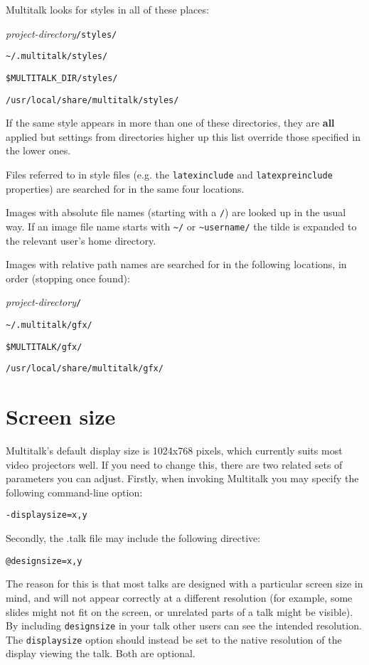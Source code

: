 \documentclass[12pt,a4paper,twoside]{article}
\renewcommand{\_}{\texttt{\symbol{95}}}
\begin{document}
Multitalk looks for styles in all of these places:
\begin{numericlist}
\item \textit{project-directory}\verb^/styles/^
\item \verb^~/.multitalk/styles/^
\item \verb^$MULTITALK_DIR/styles/^
\item \verb^/usr/local/share/multitalk/styles/^
\end{numericlist}
If the same style appears in more than one of these directories, they
are \textbf{all} applied but settings from directories higher up this list
override those specified in the lower ones.

Files referred to in style files (e.g. the \verb=latexinclude= and
\verb=latexpreinclude= properties) are searched for in the same four
locations.

Images with absolute file names (starting with a \verb=/=) are looked up in
the usual way. If an image file name starts with \verb^~/^ or
\verb^~username/^ the tilde is expanded to the relevant user's home
directory.

Images with relative path names are searched for in the
following locations, in order (stopping once found):
\begin{numericlist}
\item \textit{project-directory}\verb^/^
\item \verb^~/.multitalk/gfx/^
\item \verb^$MULTITALK/gfx/^
\item \verb^/usr/local/share/multitalk/gfx/^
\end{numericlist}

\section{Screen size}

Multitalk's default display size is 1024x768 pixels, which currently
suits most video projectors well. If you need to change this, there
are two related sets of parameters you can adjust. Firstly, when invoking
Multitalk you may specify the following command-line option:

\verb^-displaysize=x,y^

Secondly, the .talk file may include the following directive:

\verb^@designsize=x,y^

The reason for this is that most talks are designed with a particular
screen size in mind, and will not appear correctly at a different
resolution (for example, some slides might not fit on the screen,
or unrelated parts of a talk might be visible). By including
\verb^designsize^ in your talk other users can see the intended
resolution. The \verb^displaysize^ option should instead be set to
the native resolution of the display viewing the talk. Both are
optional.
\end{document}

